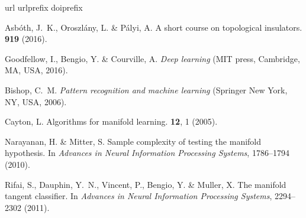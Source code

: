\documentclass[fleqn,10pt]{wlscirep}
\begin{document}
\newpage
\begin{thebibliography}{1}
\expandafter\ifx\csname url\endcsname\relax
  \def\url#1{\texttt{#1}}\fi
\expandafter\ifx\csname urlprefix\endcsname\relax\def\urlprefix{URL }\fi
\expandafter\ifx\csname doiprefix\endcsname\relax\def\doiprefix{DOI: }\fi
\providecommand{\bibinfo}[2]{#2}
\providecommand{\eprint}[2][]{\url{#2}}

\bibinfo{author}{Asb{\'o}th, J.~K.}, \bibinfo{author}{Oroszl{\'a}ny, L.} \&
  \bibinfo{author}{P{\'a}lyi, A.}
\newblock \bibinfo{journal}{\bibinfo{title}{A short course on topological
  insulators}}.
  \textbf{\bibinfo{volume}{919}} (\bibinfo{year}{2016}).

\bibinfo{author}{Goodfellow, I.}, \bibinfo{author}{Bengio, Y.} \&
  \bibinfo{author}{Courville, A.}
\newblock \emph{\bibinfo{title}{Deep learning}} (\bibinfo{publisher}{MIT press,
  Cambridge, MA, USA}, \bibinfo{year}{2016}).

\bibinfo{author}{Bishop, C.~M.}
\newblock \emph{\bibinfo{title}{Pattern recognition and machine learning}}
  (\bibinfo{publisher}{Springer New York, NY, USA}, \bibinfo{year}{2006}).

\bibinfo{author}{Cayton, L.}
\newblock \bibinfo{journal}{\bibinfo{title}{Algorithms for manifold learning}}.
  \textbf{\bibinfo{volume}{12}}, \bibinfo{pages}{1} (\bibinfo{year}{2005}).

\bibinfo{author}{Narayanan, H.} \& \bibinfo{author}{Mitter, S.}
\newblock \bibinfo{title}{Sample complexity of testing the manifold
  hypothesis}.
\newblock In \emph{\bibinfo{booktitle}{Advances in Neural Information
  Processing Systems}}, \bibinfo{pages}{1786--1794} (\bibinfo{year}{2010}).

\bibinfo{author}{Rifai, S.}, \bibinfo{author}{Dauphin, Y.~N.},
  \bibinfo{author}{Vincent, P.}, \bibinfo{author}{Bengio, Y.} \&
  \bibinfo{author}{Muller, X.}
\newblock \bibinfo{title}{The manifold tangent classifier}.
\newblock In \emph{\bibinfo{booktitle}{Advances in Neural Information
  Processing Systems}}, \bibinfo{pages}{2294--2302} (\bibinfo{year}{2011}).

\end{thebibliography}
\end{document}
